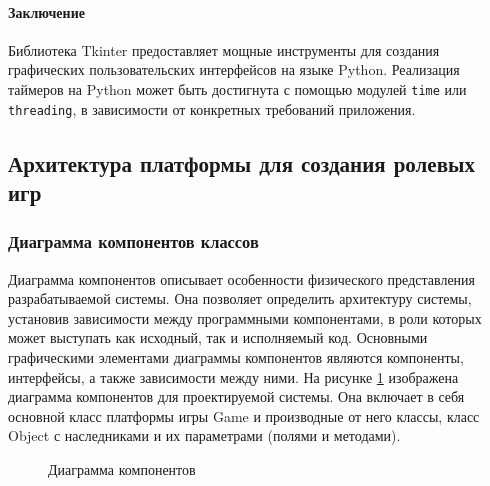 \paragraph{Заключение}
Библиотека Tkinter предоставляет мощные инструменты для создания графических пользовательских интерфейсов на языке Python. Реализация таймеров на Python может быть достигнута с помощью модулей \texttt{time} или \texttt{threading}, в зависимости от конкретных требований приложения.


\subsection{Архитектура платформы для создания ролевых игр}
\subsubsection{Диаграмма компонентов классов}
Диаграмма компонентов описывает особенности физического представления разрабатываемой системы. Она позволяет определить архитектуру системы, установив зависимости между программными компонентами, в роли которых может выступать как исходный, так и исполняемый код. Основными графическими элементами диаграммы компонентов являются компоненты, интерфейсы, а также зависимости между ними. На рисунке \ref{diagram:image} изображена диаграмма компонентов для проектируемой системы. Она включает в себя основной класс платформы игры Game и производные от него классы, класс Object с наследниками и их параметрами (полями и методами).
\begin{figure}[ht]
	\caption{Диаграмма компонентов}
	\label{diagram:image}
\end{figure}
